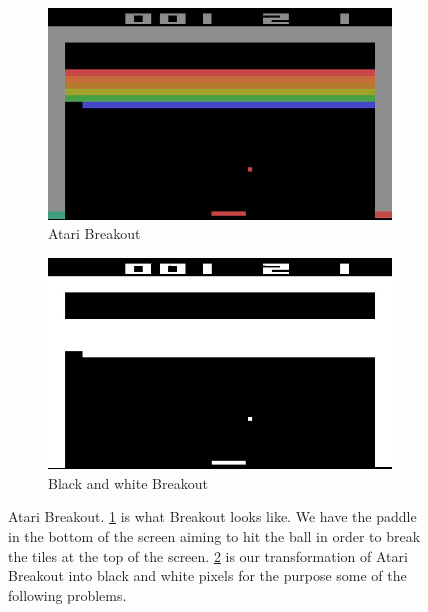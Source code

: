 \begin{figure}[H]
    \centering
    \begin{subfigure}{0.5\textwidth}
        \includegraphics[width=0.99\linewidth]{figs/atari_breakout.jpg}
        \caption{Atari Breakout}
        \label{fig:breakout}
    \end{subfigure}%
    \begin{subfigure}{0.5\textwidth}
        \includegraphics[width=0.99\linewidth]{figs/atari_breakout_bw.jpg}
        \caption{Black and white Breakout}
        \label{fig:bw_breakout}
    \end{subfigure}
    \caption{Atari Breakout. \ref{fig:breakout} is what Breakout looks like. We have the paddle in the bottom of the screen aiming to hit the ball in order to break the tiles at the top of the screen. \ref{fig:bw_breakout} is our transformation of Atari Breakout into black and white pixels for the purpose some of the following problems.}
    \label{fig:my_label}
\end{figure}


